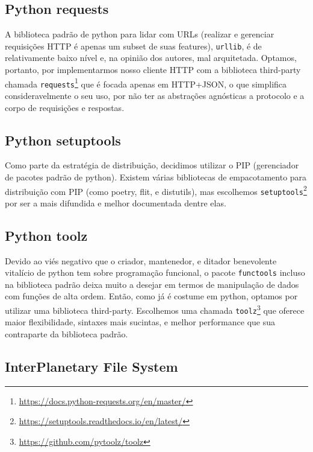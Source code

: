\subsection{Python requests}

A biblioteca padrão de python para lidar com URLs (realizar e gerenciar requisições HTTP é apenas um subset de suas features), \texttt{urllib}, é de relativamente baixo nível e, na opinião dos autores, mal arquitetada.
Optamos, portanto, por implementarmos nosso cliente HTTP com a biblioteca third-party chamada \texttt{requests}\footnote{\url{https://docs.python-requests.org/en/master/}} que é focada apenas em HTTP+JSON, o que simplifica consideravelmente o seu uso, por não ter as abstrações agnósticas a protocolo e a corpo de requisições e respostas.

\subsection{Python setuptools}

Como parte da estratégia de distribuição, decidimos utilizar o PIP (gerenciador de pacotes padrão de python).
Existem várias bibliotecas de empacotamento para distribuição com PIP (como poetry, flit, e distutils), mas escolhemos \texttt{setuptools}\footnote{\url{https://setuptools.readthedocs.io/en/latest/}} por ser a mais difundida e melhor documentada dentre elas.

\subsection{Python toolz}

Devido ao viés negativo que o criador, mantenedor, e ditador benevolente vitalício de python tem sobre programação funcional, o pacote \texttt{functools} incluso na biblioteca padrão deixa muito a desejar em termos de manipulação de dados com funções de alta ordem.
Então, como já é costume em python, optamos por utilizar uma biblioteca third-party.
Escolhemos uma chamada \texttt{toolz}\footnote{\url{https://github.com/pytoolz/toolz}} que oferece maior flexibilidade, sintaxes mais sucintas, e melhor performance que sua contraparte da biblioteca padrão.

\subsection{\label{subsec:ipfs}InterPlanetary File System}

